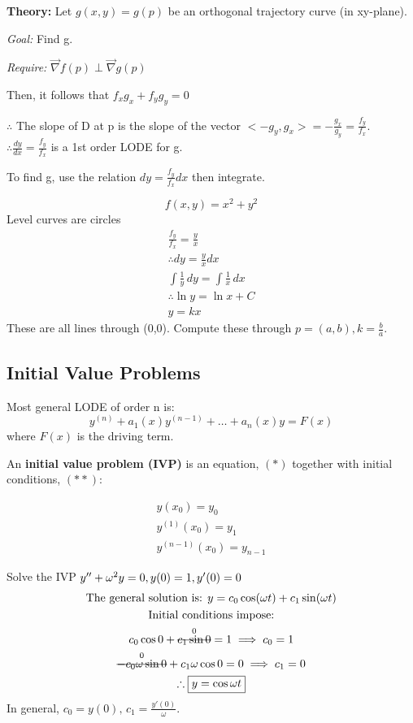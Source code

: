 \documentclass[../main.tex]{subfiles}
\begin{document}
\textbf{Theory:}
Let \( g(x,y)=g(p) \) be an orthogonal trajectory curve (in xy-plane).

\textit{Goal:} Find g.

\textit{Require:} \( \overrightarrow{\nabla}f(p)\perp\overrightarrow{\nabla}g(p) \)

Then, it follows that \( f_{x}g_{x}+f_{y}g_{y}=0 \)

\( \therefore \) The slope of D at p is the slope of the vector \( <-g_{y},g_{x}> =-\frac{g_{x}}{g_{y}}=\frac{f_{y}}{f_{x}} \). \\
\(\therefore \frac{dy}{dx}=\frac{f_{y}}{f_{x}} \) is a 1st order LODE for g.

To find g, use the relation \( dy=\frac{f_{y}}{f_{x}}dx \) then integrate.

\begin{example}[]
    \[ f(x,y)=x^2+y^2 \]
    Level curves are circles
    \begin{gather*}
        \frac{f_{y}}{f_{x}}=\frac{y}{x} \\
        \therefore dy=\frac{y}{x}dx \\
        \int \frac{1}{y} \, dy = \int \frac{1}{x} \, dx \\
        \therefore \ln y=\ln x + C \\
        y=kx
    \end{gather*}
    These are all lines through (0,0).
    Compute these through $p=(a,b),k=\frac{b}{a}$.
\end{example}

\subsection{Initial Value Problems}

Most general LODE of order n is:
\[ y^{(n)}+a_{1}(x)y^{(n-1)}+\dots+a_{n}(x)y=F(x) \]
where \( F(x) \) is the driving term.

An \textbf{initial value problem (IVP)} is an equation, \( (*) \) together with initial conditions, \( (* *) \):

\begin{gather*}
    y(x_{0})=y_{0} \\
    y^{(1)}(x_{0})=y_{1} \\
    y^{(n-1)}(x_{0})=y_{n-1}
\end{gather*}

\begin{example}[]
    Solve the IVP \( y''+\omega^2y=0, \space y(0)=1,\space y'(0)=0 \)
    \begin{gather*}
        \text{The general solution is: } y=c_{0}\cos(\omega t)+c_{1}\sin(\omega t) \\
        \text{Initial conditions impose:} \\
        c_{0}\cos0+\overset{0}{\msout{c_{1}\sin0}}=1 \implies c_0 = 1 \\
        \overset{0}{\msout{-c_0\omega\sin0}}+c_1\omega\cos0=0 \implies c_1 = 0 \\
        \therefore \boxed{y=\cos \omega t}
    \end{gather*}
    In general, \( c_0 = y(0),\,c_1 = \frac{y'(0)}{\omega} \).
\end{example}
\end{document}
